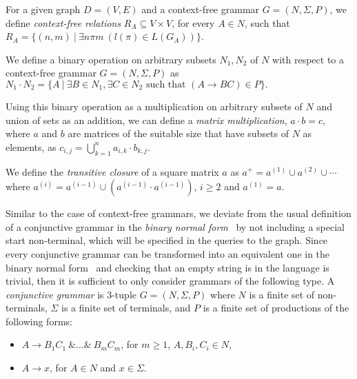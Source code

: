 For a given graph $D = (V, E)$ and a context-free grammar $G = (N, \Sigma, P)$, we define \textit{context-free relations} $R_A \subseteq V \times V$, for every $A \in N$, such that $R_A = \{(n,m)~|~\exists n \pi m~(l(\pi) \in L(G_A))\}$.

We define a binary operation on arbitrary subsets $N_1 , N_2$ of $N$ with respect to a context-free grammar $G = (N, \Sigma, P)$ as $N_1 \cdot N_2 = \{A~|~\exists B \in N_1, \exists C \in N_2 \text{ such that }(A \rightarrow B C) \in P\}.$

Using this binary operation as a multiplication on arbitrary subsets of $N$ and union of sets as an addition, we can define a \textit{matrix multiplication}, $a \cdot b = c$, where $a$ and $b$ are matrices of the suitable size that have subsets of $N$ as elements, as $c_{i,j} = \bigcup^{n}_{k=1}{a_{i,k} \cdot b_{k,j}}$.

We define the \textit{transitive closure} of a square matrix $a$ as $a^+ = a^{(1)} \cup a^{(2)} \cup \cdots$ where $a^{(i)} = a^{(i-1)} \cup (a^{(i-1)} \cdot a^{(i-1)})$, $i \ge 2$ and $a^{(1)} = a$.

Similar to the case of context-free grammars, we deviate from the usual definition of a conjunctive grammar in the \textit{binary normal form}~\cite{okhotinConjAndBool} by not including a special start non-terminal, which will be specified in the queries to the graph. Since every conjunctive grammar can be transformed into an equivalent one in the binary normal form~\cite{okhotinConjAndBool} and checking that an empty string is in the language is trivial, then it is sufficient to only consider grammars of the following type. A \textit{conjunctive grammar} is 3-tuple $G = (N, \Sigma, P)$ where $N$ is a finite set of non-terminals, $\Sigma$ is a finite set of terminals, and $P$ is a finite set of productions of the following forms:

\begin{itemize}
	\item $A \rightarrow B_1 C_1~\& \ldots \&~B_m C_m$, for $m \geq 1$, $A,B_i,C_i \in N$,
	\item $A \rightarrow x$, for $A \in N$ and $x \in \Sigma$.   
\end{itemize}

